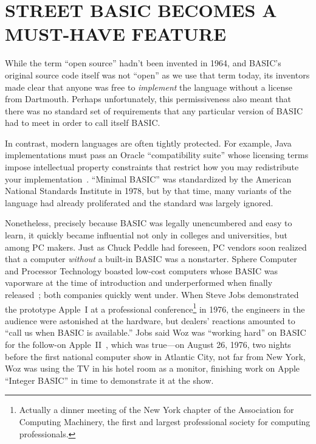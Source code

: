 
\section{STREET BASIC BECOMES A MUST-HAVE FEATURE}


While the term ``open source'' hadn't been invented in 1964, and BASIC's
original source code itself was not ``open'' as we use that term today, its
inventors made clear that anyone was free to \emph{implement} the language
without a license from Dartmouth.
Perhaps unfortunately, this permissiveness also meant that there was
no standard set of requirements that any particular version of BASIC
had to meet in order to call itself BASIC.


\begin{tangent}{}
In contrast, modern languages are often tightly protected.
For example, Java implementations must pass an Oracle ``compatibility
suite'' whose licensing terms impose intellectual property constraints
that restrict how you may redistribute your
implementation~\cite{apache-java-letter,apache-resigns-jcp}.
 ``Minimal BASIC'' was standardized by the American
National Standards Institute in 1978, but by that time, many variants
of the language had already proliferated and the standard was largely ignored.
\end{tangent}

Nonetheless, precisely because BASIC was legally unencumbered and easy to learn, it quickly became
influential not only in colleges and universities, but among PC
makers.
Just as Chuck Peddle had foreseen, PC vendors soon realized that a
computer \emph{without} a built-in BASIC was a nonstarter.
Sphere Computer and Processor Technology boasted low-cost computers
whose BASIC was vaporware at the time of introduction and
underperformed when finally released~\cite[p. 114, 134]{veit}; both
companies quickly went under.
When Steve Jobs demonstrated the prototype Apple~I at a
professional conference\footnote{Actually a dinner meeting of the New York chapter
of the Association for Computing Machinery, the first and largest
professional society for computing professionals.} in
1976, the engineers in the audience were astonished at the hardware, but
dealers' reactions amounted to ``call us when BASIC is available.''
Jobs said Woz was ``working hard'' on BASIC for the follow-on
Apple~II~\cite[pp. 92ff]{veit}, which was true---on August 26, 1976,
two nights before the first national computer show in Atlantic City,
not far from New York, Woz was using the TV in  his hotel room as a
monitor,  finishing work on Apple
``Integer BASIC'' in time to demonstrate it at the show.

